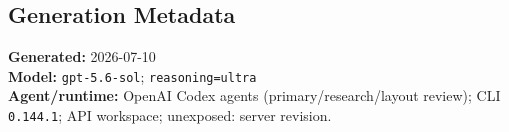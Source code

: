 \begin{deepstudy}
\section*{Generation Metadata}

{\footnotesize
\textbf{Generated:} 2026-07-10\\
\textbf{Model:} \texttt{gpt-5.6-sol}; \texttt{reasoning=ultra}\\
\textbf{Agent/runtime:} OpenAI Codex agents (primary/research/layout review); CLI \texttt{0.144.1}; API workspace; unexposed: server revision.\par
}

\end{deepstudy}

